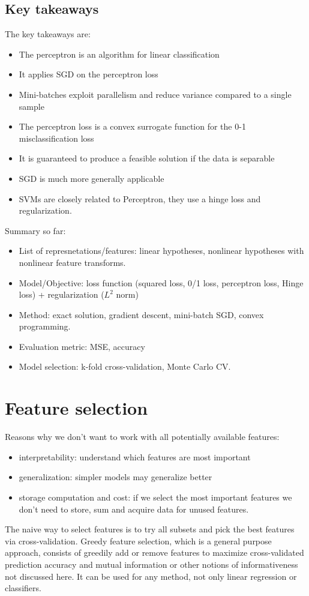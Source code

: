\documentclass[a4paper,10pt,twoside]{article}
\begin{document}
\subsection{Key takeaways}
The key takeaways are:
\begin{itemize}
    \item The perceptron is an algorithm for linear classification
    \item It applies SGD on the perceptron loss
    \item Mini-batches exploit parallelism and reduce variance compared to a single sample
    \item The perceptron loss is a convex surrogate function for the 0-1 misclassification loss
    \item It is guaranteed to produce a feasible solution if the data is separable
    \item SGD is much more generally applicable
    \item SVMs are closely related to Perceptron, they use a hinge loss and regularization.
\end{itemize}
Summary so far:
\begin{itemize}
    \item List of represnetations/features: linear hypotheses, nonlinear hypotheses with nonlinear feature transforms.
    \item Model/Objective: loss function (squared loss, 0/1 loss, perceptron loss, Hinge loss) + regularization ($L^2$ norm)
    \item Method: exact solution, gradient descent, mini-batch SGD, convex programming.
    \item Evaluation metric: MSE, accuracy
    \item Model selection: k-fold cross-validation, Monte Carlo CV.
\end{itemize}

\section{Feature selection}
Reasons why we don't want to work with all potentially available features:
\begin{itemize}
    \item interpretability: understand which features are most important
    \item generalization: simpler models may generalize better
    \item storage computation and cost: if we select the most important features we don't need to store, sum and acquire data for unused features.
\end{itemize}
The naive way to select features is to try all subsets and pick the best features via cross-validation. Greedy feature selection, which is a general purpose approach, consists of greedily add or remove features to maximize cross-validated prediction accuracy and mutual information or other notions of informativeness not discussed here. It can be used for any method, not only linear regression or classifiers.
\end{document}
